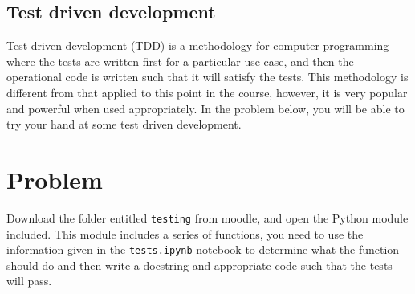 \documentclass[a4paper]{article}
\begin{document}
\vspace{\baselineskip}
\begin{center}
	\noindent{}
\end{center}

\subsection{Test driven development}
Test driven development (TDD) is a methodology for computer programming where the tests are written first for a particular use case, and then the operational code is written such that it will satisfy the tests.
This methodology is different from that applied to this point in the course, however, it is very popular and powerful when used appropriately.
In the problem below, you will be able to try your hand at some test driven development.

\section{Problem}
Download the folder entitled \texttt{testing} from moodle, and open the Python module included.
This module includes a series of functions, you need to use the information given in the \texttt{tests.ipynb} notebook to determine what the function should do and then write a docstring and appropriate code such that the tests will pass. 

%
%
\end{document}
